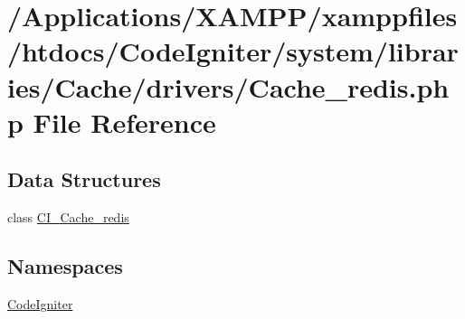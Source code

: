 \hypertarget{_cache__redis_8php}{}\section{/\+Applications/\+X\+A\+M\+P\+P/xamppfiles/htdocs/\+Code\+Igniter/system/libraries/\+Cache/drivers/\+Cache\+\_\+redis.php File Reference}
\label{_cache__redis_8php}
\subsection*{Data Structures}
\begin{DoxyCompactItemize}
\item 
class \mbox{\hyperlink{class_c_i___cache__redis}{C\+I\+\_\+\+Cache\+\_\+redis}}
\end{DoxyCompactItemize}
\subsection*{Namespaces}
\begin{DoxyCompactItemize}
\item 
 \mbox{\hyperlink{namespace_code_igniter}{Code\+Igniter}}
\end{DoxyCompactItemize}
